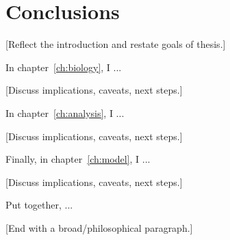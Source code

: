 \chapter{Conclusions}
\label{ch:concl}

[Reflect the introduction and restate goals of thesis.]

In chapter~\ref{ch:biology}, I ...

[Discuss implications, caveats, next steps.]

In chapter~\ref{ch:analysis}, I ...

[Discuss implications, caveats, next steps.]

Finally, in chapter~\ref{ch:model}, I ...

[Discuss implications, caveats, next steps.]

Put together, ...

[End with a broad/philosophical paragraph.]
